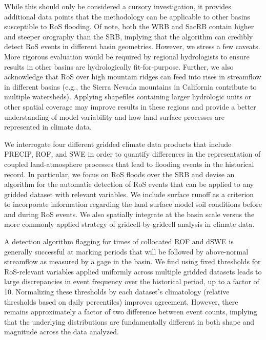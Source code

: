 \documentclass[nhess, manuscript]{copernicus}
\begin{document}
While this should only be considered a cursory investigation, it provides additional data points that the methodology can be applicable to other basins susceptible to RoS flooding.
Of note, both the WRB and SacRB contain higher and steeper orography than the SRB, implying that the algorithm can credibly detect RoS events in different basin geometries.
However, we stress a few caveats. More rigorous evaluation would be required by regional hydrologists to ensure results in other basins are hydrologically fit-for-purpose.
Further, we also acknowledge that RoS over high mountain ridges can feed into rises in streamflow in different basins (e.g., the Sierra Nevada mountains in California contribute to multiple watersheds).
Applying shapefiles containing larger hydrologic units or other spatial coverage may improve results in these regions and provide a better understanding of model variability and how land surface processes are represented in climate data.

\conclusions

We interrogate four different gridded climate data products that include PRECIP, ROF, and SWE in order to quantify differences in the representation of coupled land-atmosphere processes that lead to flooding events in the historical record.
In particular, we focus on RoS floods over the SRB and devise an algorithm for the automatic detection of RoS events that can be applied to any gridded dataset with relevant variables.
We include surface runoff as a criterion to incorporate information regarding the land surface model soil conditions before and during RoS events.
We also spatially integrate at the basin scale versus the more commonly applied strategy of gridcell-by-gridcell analysis in climate data.

A detection algorithm flagging for times of collocated ROF and dSWE is generally successful at marking periods that will be followed by above-normal streamflow as measured by a gage in the basin.
We find using fixed thresholds for RoS-relevant variables applied uniformly across multiple gridded datasets leads to large discrepancies in event frequency over the historical period, up to a factor of 10.
Normalizing these thresholds by each dataset's climatology (relative thresholds based on daily percentiles) improves agreement.
However, there remains approximately a factor of two difference between event counts, implying that the underlying distributions are fundamentally different in both shape and magnitude across the data analyzed.

\end{document}
